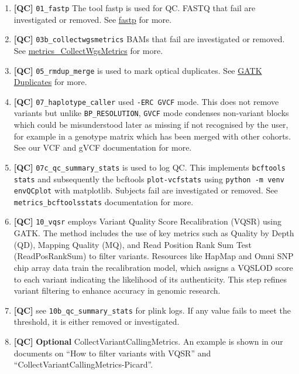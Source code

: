 \begin{enumerate}
    \item \textbf{[QC]} \colorbox{kispiblue!30}{\texttt{01\_fastp}} The tool fastp is used for QC. FASTQ that fail are investigated or removed. See \href{fastp.html}{fastp} for more.
    \item \textbf{[QC]} \colorbox{kispiblue!30}{\texttt{03b\_collectwgsmetrics}} BAMs that fail are investigated or removed. See \href{metrics_CollectWgsMetrics.html}{metrics\_CollectWgsMetrics} for more.
    \item \textbf{[QC]} \colorbox{kispiblue!30}{\texttt{05\_rmdup\_merge}} is used to mark optical duplicates. See \href{design\_doc/gatk\_duplicates.html}{GATK Duplicates} for more.
    \item \textbf{[QC]} \colorbox{kispiblue!30}{\texttt{07\_haplotype\_caller}} used \texttt{-ERC GVCF} mode. This does not remove variants but unlike \texttt{BP\_RESOLUTION}, \texttt{GVCF} mode condenses non-variant blocks which could be misunderstood later as missing if not recognised by the user, for example in a genotype matrix which has been merged with other cohorts.  See our VCF and gVCF documentation for more.
    \item \textbf{[QC]} \colorbox{kispiblue!30}{\texttt{07c\_qc\_summary\_stats}} is used to log QC. This implements \texttt{bcftools stats} and subsequently the bcftools \texttt{plot-vcfstats} using \texttt{python -m venv envQCplot} with matplotlib. Subjects fail are investigated or removed. See \texttt{metrics\_bcftoolsstats} documentation for more.
    
    \item \textbf{[QC]} \colorbox{kispiblue!30}{\texttt{10\_vqsr}} employs Variant Quality Score Recalibration (VQSR) using GATK. The method includes the use of key metrics such as Quality by Depth (QD), Mapping Quality (MQ), and Read Position Rank Sum Test (ReadPosRankSum) to filter variants. Resources like HapMap and Omni SNP chip array data train the recalibration model, which assigns a VQSLOD score to each variant indicating the likelihood of its authenticity. This step refines variant filtering to enhance accuracy in genomic research.

    \item \textbf{[QC]} see \colorbox{kispiblue!30}{\texttt{10b\_qc\_summary\_stats}} for plink logs. If any value fails to meet the threshold, it is either removed or investigated.
    
    \item \textbf{[QC]} \textbf{Optional} CollectVariantCallingMetrics. An example is shown in our documents on ``How to filter variants with VQSR'' and   ``CollectVariantCallingMetrics-Picard''.
    

\end{enumerate}
